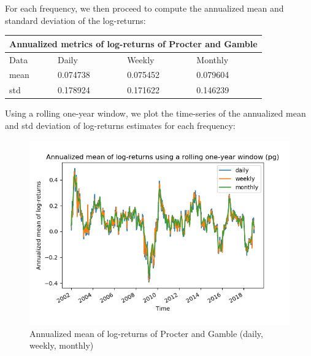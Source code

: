 \documentclass[10pt]{article}
\newenvironment{exercise}[2][Exercise]{\begin{trivlist}
  \item[\hskip \labelsep {\bfseries #1}\hskip \labelsep {\bfseries #2.}]}{\end{trivlist}}
\begin{document}
\begin{exercise}{4}
	\bigbreak	
	
	For each frequency, we then proceed to compute the annualized mean and standard deviation of the log-returns:
	
	\bigbreak
	
	\begin{tabular}{ |p{3cm}||p{3cm}|p{3cm}|p{3cm}|  }
		\hline
	 	\multicolumn{4}{|c|}{Annualized metrics of log-returns of Procter and Gamble} \\
	 	\hline
	 	Data & Daily & Weekly & Monthly\\
 		\hline
 		mean  &  0.074738 & 0.075452 & 0.079604\\
 		std & 0.178924 & 0.171622 & 0.146239\\
 		\hline
	\end{tabular}
	
	\bigbreak	
	
	Using a rolling one-year window, we plot the time-series of the annualized mean and std deviation of log-returns estimates for each frequency:
	
	\begin{figure}[H]
	
		\centering
		\includegraphics[scale=0.5]{Figures/problem4d_mean_pg.png}	
		\caption{Annualized mean of log-returns of Procter and Gamble (daily, weekly, monthly)}	
		\label{fig:problem3d_mean_pg}
	
	\end{figure}
	
	\begin{figure}[H]
	

\end{figure}
\end{exercise}
\end{document}
